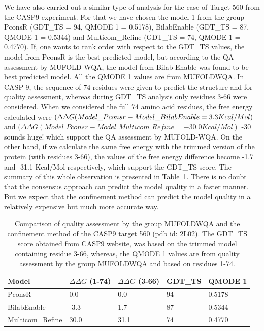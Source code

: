 \documentclass[12pt]{article}
\newcommand{\Alberto}[1]{\color{ForestGreen}#1\normalcolor }
\begin{document}
We have also carried out a similar type of analysis for the case of Target 560 from the CASP9
experiment. For that we have chosen the model 1 from the group PconsR (GDT\_TS = 94, QMODE 1 =
0.5178), Bilab\-Enable (GDT\_TS = 87, QMODE 1 = 0.5344) and Multicom\_Refine (GDT\_TS = 74, QMODE 1
= 0.4770). If, one wants to rank order with respect to the GDT\_TS values, the model from PconsR is
the best predicted model, but according to the QA assessment by MUFOLD-WQA, the model from
Bilab-Enable was found to be best predicted model. All the QMODE 1 values are from MUFOLD\-WQA. In
CASP 9, the sequence of 74 residues were given to predict the structure and for quality assessment,
whereas during GDT\_TS analysis only residues 3-66 were considered. When we considered the full 74
amino acid residues, the free energy calculated were $(\Delta \Delta G (Model\_Pconsr -
Model\_Bilab\-Enable = 3.3 Kcal/Mol)$ and $(\Delta \Delta G (Model\_Pconsr - Model\_Multicom\_Refine
= -30.0 Kcal/Mol)$ \Alberto{-30 sounds huge!} which support the QA assessment by MUFOLD-WQA. On the
other hand, if we calculate the same free energy with the trimmed version of the protein (with
residues 3-66), the values of the free energy difference become -1.7 and -31.1 Kcal/Mol
respectively, which support the GDT\_TS score. The summary of this whole observation is presented in
Table~\ref{table:560QA}. There is no doubt that the consensus approach can predict the model quality
in a faster manner. But we expect that the confinement method can predict the model quality in a
relatively expensive but much more accurate way.

\begin{table}
\label{table:560QA}
\begin{center}
\begin{tabular}{| l | l | l | l | l |}
\hline
Model            &  $\Delta \Delta G$ (1-74)  & $\Delta \Delta G$ (3-66) &    GDT\_TS    & QMODE 1  \\ \hline
PconsR           &         0.0                &      0.0                 &    94         &  0.5178   \\ \hline
Bilab\-Enable     &        -3.3                &      1.7                 &    87         &  0.5344   \\ \hline
Multicom\_Refine &        30.0                &     31.1                 &    74         &  0.4770   \\ \hline
\end{tabular}
\end{center}
\caption{Comparison of quality assessment by the group MUFOLD\-WQA and the confinement method of the CASP9 target 560 (pdb id: 2L02). 
The GDT\_TS score obtained from CASP9 website, was based on the trimmed model containing residue 3-66, whereas, the QMODE 1 values are from
quality assessment by the group MUFOLD\-WQA and based on residues 1-74.}
\end{table}  
\end{document}

